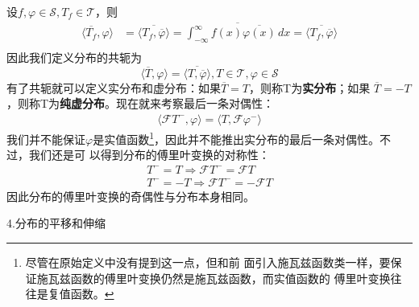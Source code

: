 \documentclass{ctexbook}
\begin{document}
设$f,\varphi\in\mathcal{S} ,T_f\in\mathcal{T} $，则
\begin{align*}
    \langle \overline{T_f},\varphi\rangle & =\overline{\langle T_f,\overline{\varphi}\rangle}=\overline{\int_{-\infty}^{\infty}f(x)\overline{\varphi(x)}\,dx}=\overline{\langle T_f,\overline{\varphi}\rangle} \\
\end{align*}
因此我们定义分布的共轭为
\begin{equation}
    \langle \overline{T},\varphi\rangle=\overline{\langle T,\overline{\varphi}\rangle},T\in\mathcal{T} ,\varphi\in\mathcal{S}
\end{equation}
有了共轭就可以定义实分布和虚分布：如果$\overline{T}=T$，则称T为\textbf{实分布}；如果
$\overline{T}=-T$，则称T为\textbf{纯虚分布}。现在就来考察最后一条对偶性：
\begin{align*}
    \langle\mathcal{F}T^-,\varphi\rangle =\langle T,\mathcal{F}\varphi^-\rangle
\end{align*}
我们并不能保证$\varphi$是实值函数\footnote{尽管在原始定义中没有提到这一点，但和前
    面引入施瓦兹函数类一样，要保证施瓦兹函数的傅里叶变换仍然是施瓦兹函数，而实值函数的
    傅里叶变换往往是复值函数。}，因此并不能推出实分布的最后一条对偶性。不过，我们还是可
以得到分布的傅里叶变换的对称性：
\begin{align*}
    T^-=T\Rightarrow\mathcal{F} T^-=\mathcal{F} T \\
    T^-=-T\Rightarrow\mathcal{F} T^-=-\mathcal{F} T
\end{align*}
因此分布的傅里叶变换的奇偶性与分布本身相同。

\noindent 4.分布的平移和伸缩
\end{document}
